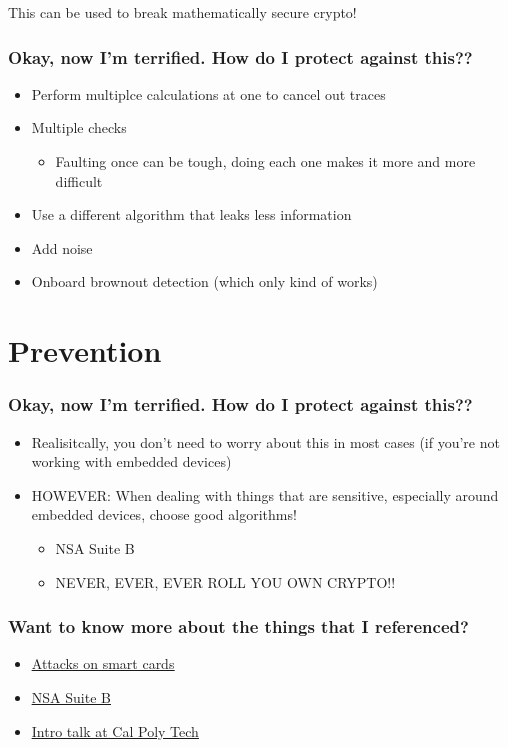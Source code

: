 \documentclass{beamer}
\begin{document}
\begin{frame}
\begin{center}This can be used to break mathematically secure crypto!\end{center}
\end{frame}

\begin{frame}[t]
\frametitle{Okay, now I'm terrified. How do I protect against this??}
\begin{itemize}
\item Perform multiplce calculations at one to cancel out traces
\item Multiple checks
    \begin{itemize}
        \item Faulting once can be tough, doing each one makes it more and more difficult
    \end{itemize}
\item Use a different algorithm that leaks less information
\item Add noise
\item Onboard brownout detection (which only kind of works)
\end{itemize}
\end{frame}

\section{Prevention}

\begin{frame}[t]
\frametitle{Okay, now I'm terrified. How do I protect against this??}
\begin{itemize}
\item Realisitcally, you don't need to worry about this in most cases (if you're not working with embedded devices)
\item HOWEVER: When dealing with things that are sensitive, especially around embedded devices, choose good algorithms!
    \begin{itemize}
        \item NSA Suite B
        \item NEVER, EVER, EVER ROLL YOU OWN CRYPTO!!
    \end{itemize}
\end{itemize}
\end{frame}

\begin{frame}[t]
  \frametitle{Want to know more about the things that I referenced?}
  \begin{itemize}
    \item\underline{\href{http://infosecwriters.com/text_resources/pdf/Known_Attacks_Against_Smartcards.pdf}{Attacks on smart cards}}
    \item\underline{\href{http://csrc.nist.gov/groups/SMA/ispab/documents/minutes/2006-03/E_Barker-March2006-ISPAB.pdf}{NSA Suite B}}
    \item\underline{\href{https://www.youtube.com/watch?v=bHncSnHQleY}{Intro talk at Cal Poly Tech}}
    
  \end{itemize}
\end{frame}
\end{document}
